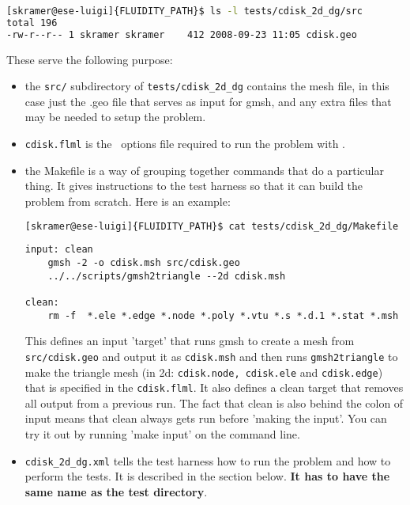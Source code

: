 \begin{example}
\begin{lstlisting}[language=bash]
[skramer@ese-luigi]{FLUIDITY_PATH}$ ls -l tests/cdisk_2d_dg/src 
total 196 
-rw-r--r-- 1 skramer skramer    412 2008-09-23 11:05 cdisk.geo
\end{lstlisting}
\end{example}

These serve the following purpose:
\begin{itemize}
\item the \lstinline[language=bash]+src/+ subdirectory of \lstinline[language=bash]+tests/cdisk_2d_dg+ contains the mesh file, in this case just the .geo file that serves as input for gmsh, and any extra files that may be needed to setup the problem. 
\item \lstinline[language=bash]+cdisk.flml+ is the \fluidity\ options file required to run the problem with \fluidity.
\item the Makefile is a way of grouping together commands that do a particular thing. It gives instructions to the test harness so that it can build the problem from scratch. Here is an example:

\begin{example}
\begin{lstlisting}[language=bash]
[skramer@ese-luigi]{FLUIDITY_PATH}$ cat tests/cdisk_2d_dg/Makefile
\end{lstlisting}
\begin{lstlisting}[language=Make]
input: clean
	gmsh -2 -o cdisk.msh src/cdisk.geo 
	../../scripts/gmsh2triangle --2d cdisk.msh

clean:
	rm -f  *.ele *.edge *.node *.poly *.vtu *.s *.d.1 *.stat *.msh 
\end{lstlisting}
\end{example}

This defines an input 'target' that runs gmsh to create a mesh from \lstinline[language=bash]+src/cdisk.geo+ and output it as \lstinline[language=bash]+cdisk.msh+ and then runs \lstinline[language=bash]+gmsh2triangle+ to make the triangle mesh (in 2d: \lstinline[language=bash]+cdisk.node, cdisk.ele+ and \lstinline[language=bash]+cdisk.edge+) that is specified in the \lstinline[language=bash]+cdisk.flml+. It also defines a clean target that removes all output from a previous run. The fact that clean is also behind the colon of input means that clean always gets run before 'making the input'. You can try it out by running 'make input' on the command line. 

\item \lstinline[language=bash]+cdisk_2d_dg.xml+ tells the test harness how to run the problem and how to perform the tests. It is described in the section below. {\bf It has to have the same name as the test directory}. 
\end{itemize}

